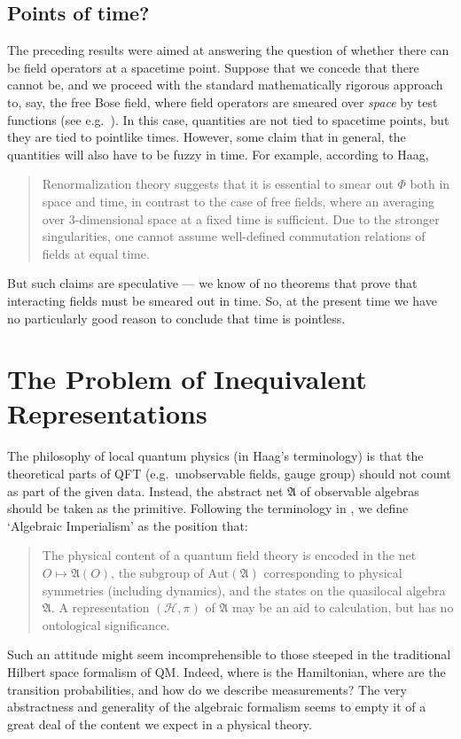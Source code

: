 \documentclass[12pt]{article}
\theoremstyle{definition}
\theoremstyle{definition}
\theoremstyle{remark}
\def\2#1{{\mathcal #1}}
\def\al#1{{\mathfrak #1}}
\newcommand{\Aut}{\mathrm{Aut}}
\begin{document}
\subsection{Points of time?}

The preceding results were aimed at answering the question of whether
there can be field operators at a spacetime point.  Suppose that we
concede that there cannot be, and we proceed with the standard
mathematically rigorous approach to, say, the free Bose field, where
field operators are smeared over \emph{space} by test functions (see
e.g.\ \cite{arak-bose}).  In this case, quantities are not tied to
spacetime points, but they are tied to pointlike times.  However, some
claim that in general, the quantities will also have to be fuzzy in
time.  For example, according to Haag,
\begin{quote}
  Renormalization theory suggests that it is essential to smear out
  $\Phi$ both in space and time, in contrast to the case of free
  fields, where an averaging over $3$-dimensional space at a fixed
  time is sufficient.  Due to the stronger singularities, one cannot
  assume well-defined commutation relations of fields at equal time.
  \cite[p.\ 59]{haag} \end{quote} But such claims are speculative ---
we know of no theorems that prove that interacting fields must be
smeared out in time.  So, at the present time we have no particularly
good reason to conclude that time is pointless.


\section{The Problem of Inequivalent Representations} \label{inter}

The philosophy of local quantum physics (in Haag's terminology) is
that the theoretical parts of QFT (e.g.\ unobservable fields, gauge
group) should not count as part of the given data.  Instead, the
abstract net $\al A$ of observable algebras should be taken as the
primitive.  Following the terminology in \cite{ruetsche}, we define
`Algebraic Imperialism' as the position that:
\begin{quote}
  The physical content of a quantum field theory is encoded in the net
  $O\mapsto \al A(O)$, the subgroup of $\Aut (\al A)$ corresponding to
  physical symmetries (including dynamics), and the states on the
  quasilocal algebra $\al A$.  A representation $(\2H ,\pi )$ of $\al
  A$ may be an aid to calculation, but has no ontological
  significance.
\end{quote}
Such an attitude might seem incomprehensible to those steeped in the
traditional Hilbert space formalism of QM. Indeed, where is the
Hamiltonian, where are the transition probabilities, and how do we
describe measurements?  The very abstractness and generality of the
algebraic formalism seems to empty it of a great deal of the content
we expect in a physical theory.
\end{document}
